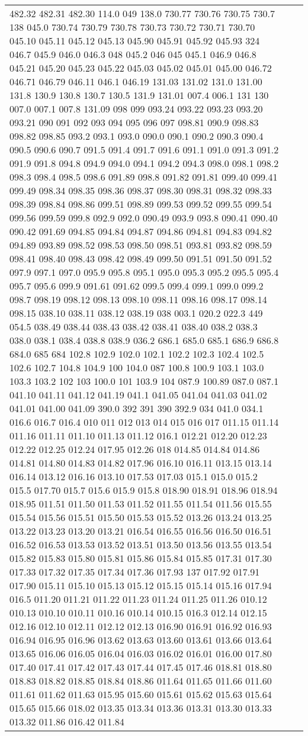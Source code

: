 \begin{longtable}{|R{.05in}|L{.5in}||L{5.75in}|}
482.32 482.31 482.30 114.0 049 138.0 730.77 730.76 730.75 730.7 138 045.0 730.74 730.79 730.78 730.73 730.72 730.71 730.70 045.10 045.11 045.12 045.13 045.90 045.91 045.92 045.93 324 046.7 045.9 046.0 046.3 048 045.2 046 045 045.1 046.9 046.8 045.21 045.20 045.23 045.22 045.03 045.02 045.01 045.00 046.72 046.71 046.79 046.11 046.1 046.19 131.03 131.02 131.0 131.00 131.8 130.9 130.8 130.7 130.5 131.9 131.01 007.4 006.1 131 130 007.0 007.1 007.8 131.09 098 099 093.24 093.22 093.23 093.20 093.21 090 091 092 093 094 095 096 097 098.81 090.9 098.83 098.82 098.85 093.2 093.1 093.0 090.0 090.1 090.2 090.3 090.4 090.5 090.6 090.7 091.5 091.4 091.7 091.6 091.1 091.0 091.3 091.2 091.9 091.8 094.8 094.9 094.0 094.1 094.2 094.3 098.0 098.1 098.2 098.3 098.4 098.5 098.6 091.89 098.8 091.82 091.81 099.40 099.41 099.49 098.34 098.35 098.36 098.37 098.30 098.31 098.32 098.33 098.39 098.84 098.86 099.51 098.89 099.53 099.52 099.55 099.54 099.56 099.59 099.8 092.9 092.0 090.49 093.9 093.8 090.41 090.40 090.42 091.69 094.85 094.84 094.87 094.86 094.81 094.83 094.82 094.89 093.89 098.52 098.53 098.50 098.51 093.81 093.82 098.59 098.41 098.40 098.43 098.42 098.49 099.50 091.51 091.50 091.52 097.9 097.1 097.0 095.9 095.8 095.1 095.0 095.3 095.2 095.5 095.4 095.7 095.6 099.9 091.61 091.62 099.5 099.4 099.1 099.0 099.2 098.7 098.19 098.12 098.13 098.10 098.11 098.16 098.17 098.14 098.15 038.10 038.11 038.12 038.19 038 003.1 020.2 022.3 449 054.5 038.49 038.44 038.43 038.42 038.41 038.40 038.2 038.3 038.0 038.1 038.4 038.8 038.9 036.2 686.1 685.0 685.1 686.9 686.8 684.0 685 684 102.8 102.9 102.0 102.1 102.2 102.3 102.4 102.5 102.6 102.7 104.8 104.9 100 104.0 087 100.8 100.9 103.1 103.0 103.3 103.2 102 103 100.0 101 103.9 104 087.9 100.89 087.0 087.1 041.10 041.11 041.12 041.19 041.1 041.05 041.04 041.03 041.02 041.01 041.00 041.09 390.0 392 391 390 392.9 034 041.0 034.1 016.6 016.7 016.4 010 011 012 013 014 015 016 017 011.15 011.14 011.16 011.11 011.10 011.13 011.12 016.1 012.21 012.20 012.23 012.22 012.25 012.24 017.95 012.26 018 014.85 014.84 014.86 014.81 014.80 014.83 014.82 017.96 016.10 016.11 013.15 013.14 016.14 013.12 016.16 013.10 017.53 017.03 015.1 015.0 015.2 015.5 017.70 015.7 015.6 015.9 015.8 018.90 018.91 018.96 018.94 018.95 011.51 011.50 011.53 011.52 011.55 011.54 011.56 015.55 015.54 015.56 015.51 015.50 015.53 015.52 013.26 013.24 013.25 013.22 013.23 013.20 013.21 016.54 016.55 016.56 016.50 016.51 016.52 016.53 013.53 013.52 013.51 013.50 013.56 013.55 013.54 015.82 015.83 015.80 015.81 015.86 015.84 015.85 017.31 017.30 017.33 017.32 017.35 017.34 017.36 017.93 137 017.92 017.91 017.90 015.11 015.10 015.13 015.12 015.15 015.14 015.16 017.94 016.5 011.20 011.21 011.22 011.23 011.24 011.25 011.26 010.12 010.13 010.10 010.11 010.16 010.14 010.15 016.3 012.14 012.15 012.16 012.10 012.11 012.12 012.13 016.90 016.91 016.92 016.93 016.94 016.95 016.96 013.62 013.63 013.60 013.61 013.66 013.64 013.65 016.06 016.05 016.04 016.03 016.02 016.01 016.00 017.80 017.40 017.41 017.42 017.43 017.44 017.45 017.46 018.81 018.80 018.83 018.82 018.85 018.84 018.86 011.64 011.65 011.66 011.60 011.61 011.62 011.63 015.95 015.60 015.61 015.62 015.63 015.64 015.65 015.66 018.02 013.35 013.34 013.36 013.31 013.30 013.33 013.32 011.86 016.42 011.84 
\end{longtable}
